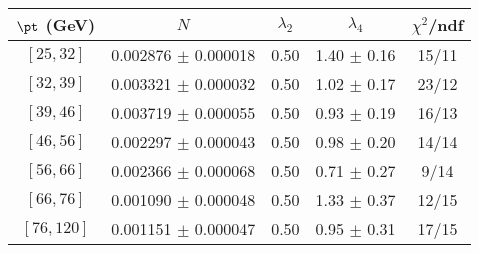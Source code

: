 \begin{tabular}{c||c|c|c|c}
$\pt$ (GeV) & $N$ & $\lambda_{2}$ & $\lambda_4$  & $\chi^2$/ndf  \\
\hline
$[25, 32]$ & 0.002876 $\pm$ 0.000018 & 0.50 & 1.40 $\pm$ 0.16 & 15/11\\
$[32, 39]$ & 0.003321 $\pm$ 0.000032 & 0.50 & 1.02 $\pm$ 0.17 & 23/12\\
$[39, 46]$ & 0.003719 $\pm$ 0.000055 & 0.50 & 0.93 $\pm$ 0.19 & 16/13\\
$[46, 56]$ & 0.002297 $\pm$ 0.000043 & 0.50 & 0.98 $\pm$ 0.20 & 14/14\\
$[56, 66]$ & 0.002366 $\pm$ 0.000068 & 0.50 & 0.71 $\pm$ 0.27 & 9/14\\
$[66, 76]$ & 0.001090 $\pm$ 0.000048 & 0.50 & 1.33 $\pm$ 0.37 & 12/15\\
$[76, 120]$ & 0.001151 $\pm$ 0.000047 & 0.50 & 0.95 $\pm$ 0.31 & 17/15\\
\end{tabular}
